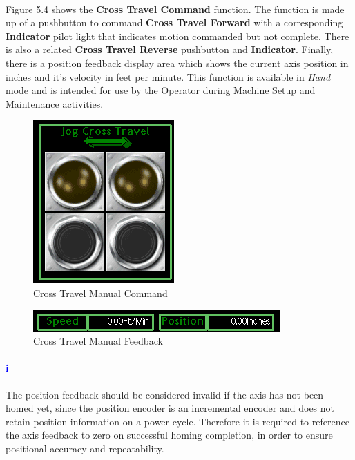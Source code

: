 \paragraph*{}Figure 5.4 shows the \textbf{Cross Travel Command} function. The function is made up of a pushbutton to command \textbf{Cross Travel Forward} with a corresponding \textbf{Indicator} pilot light that indicates motion commanded but not complete. There is also a related \textbf{Cross Travel Reverse} pushbutton and \textbf{Indicator}. Finally, there is a position feedback display area which shows the current axis position in inches and it's velocity in feet per minute. This function is available in \textit{Hand} mode and is intended for use by the Operator during Machine Setup and Maintenance activities.
\begin{figure}
	\centering
	\includegraphics[width=.2\linewidth]{screen-captures/manual/trans-manual-command}
	\caption{Cross Travel Manual Command}
	\label{fig:cross-manual-command}
\end{figure}
\begin{figure}
	\centering
	\includegraphics[width=.2\linewidth]{screen-captures/manual/trans-manual-fdbk}
	\caption{Cross Travel Manual Feedback}
	\label{fig:cross-manual-fdbk}
\end{figure} 
\paragraph{\textbf{\LARGE \textcolor{blue}{i}}}The position feedback should be considered invalid if the axis has not been homed yet, since the position encoder is an incremental encoder and does not retain position information on a power cycle. Therefore it is required to reference the axis feedback to zero on successful homing completion, in order to ensure positional accuracy and repeatability.
